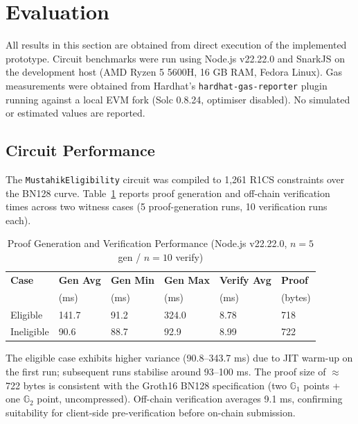 \documentclass[conference]{IEEEtran}
\begin{document}
\section{Evaluation}

All results in this section are obtained from direct execution of the implemented prototype. Circuit benchmarks were run using Node.js v22.22.0 and SnarkJS on the development host (AMD Ryzen 5 5600H, 16 GB RAM, Fedora Linux). Gas measurements were obtained from Hardhat's \texttt{hardhat-gas-reporter} plugin running against a local EVM fork (Solc 0.8.24, optimiser disabled). No simulated or estimated values are reported.

\subsection{Circuit Performance}

The \texttt{MustahikEligibility} circuit was compiled to 1,261 R1CS constraints over the BN128 curve. Table~\ref{tab:proof_perf} reports proof generation and off-chain verification times across two witness cases (5 proof-generation runs, 10 verification runs each).

\begin{table}[h]
\caption{Proof Generation and Verification Performance (Node.js v22.22.0, $n=5$ gen / $n=10$ verify)}
\label{tab:proof_perf}
\centering
\begin{tabularx}{\columnwidth}{p{1.6cm} p{1.1cm} p{1.1cm} p{1.1cm} p{1.1cm} p{1.0cm}}
\toprule
\textbf{Case} & \textbf{Gen Avg} & \textbf{Gen Min} & \textbf{Gen Max} & \textbf{Verify Avg} & \textbf{Proof} \\
 & (ms) & (ms) & (ms) & (ms) & (bytes) \\
\midrule
Eligible   & 141.7 & 91.2  & 324.0 & 8.78 & 718 \\
Ineligible & 90.6  & 88.7  & 92.9  & 8.99 & 722 \\
\bottomrule
\end{tabularx}
\end{table}

The eligible case exhibits higher variance (90.8--343.7 ms) due to JIT warm-up on the first run; subsequent runs stabilise around 93--100 ms. The proof size of $\approx$722 bytes is consistent with the Groth16 BN128 specification (two $\mathbb{G}_1$ points + one $\mathbb{G}_2$ point, uncompressed). Off-chain verification averages 9.1 ms, confirming suitability for client-side pre-verification before on-chain submission.
\end{document}
